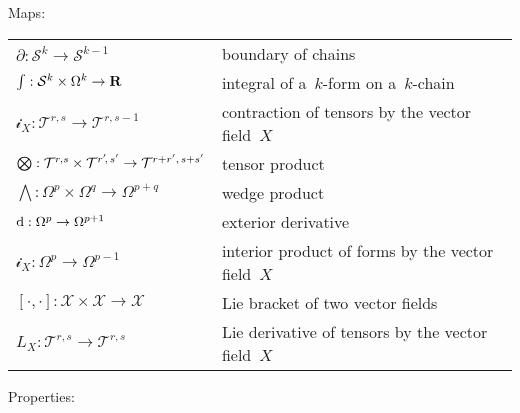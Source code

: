 \bigskip

Maps:

\begin{tabular}{l|l}
	\hline
	$\partial:\mathcal{S}^k\to\mathcal{S}^{k-1}$ & boundary of chains \\
	$\int:\mathcal{S}^k\times\Omega^k\to\mathbf{R}$ & integral of a~$k$-form on
	a~$k$-chain \\
	$\mathcal{i}_X:\mathcal{T}^{r,s}\to\mathcal{T}^{r,s-1}$ & contraction of
	tensors by the vector field~$X$\\
	$\bigotimes:\mathcal{T}^{r,s}\times\mathcal{T}^{r'\!,\,s'}\to
	\mathcal{T}^{r+r'\/,\,s+s'}$ & tensor product \\
	$\bigwedge:\Omega^p\times\Omega^q\to\Omega^{p+q}$ & wedge product \\
	$\mathrm{d}:\Omega^p\to\Omega^{p+1}$ & exterior derivative \\
	$\mathcal{i}_X:\Omega^p\to\Omega^{p-1}$ & interior product of forms by the
	vector field~$X$ \\
	$[\cdot,\cdot]:\mathcal{X}\times\mathcal{X}\to\mathcal{X}$ & Lie bracket of
	two vector fields \\
	$L_X:\mathcal{T}^{r,s}\to\mathcal{T}^{r,s}$ & Lie derivative of tensors by
	the vector field~$X$ \\
\end{tabular}


\clearpage

Properties:

